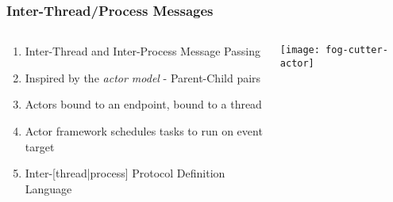 \documentclass[
	notes=none,
	aspectratio=169
]{beamer}
\begin{document}
\begin{frame}
\frametitle{Inter-Thread/Process Messages}

\begin{columns}[T]
\begin{column}[T]{0.7\textwidth}
\setlength{\parskip}{0.5em}

\vspace{1.0cm}
\begin{enumerate}
\setlength{\parskip}{0.5em}
\item Inter-Thread and Inter-Process Message Passing
\item Inspired by the {\it actor model\/} - Parent-Child pairs
\item Actors bound to an endpoint, bound to a thread
\item Actor framework schedules tasks to run on event target
\item Inter-[thread|process] Protocol Definition Language
\end{enumerate}

\end{column}
\begin{column}[T]{0.3\textwidth}
\setlength{\parskip}{0.5em}

\vspace{0.7cm}
\texttt{[image: fog-cutter-actor]}

\end{column}
\end{columns}

\end{frame}

\end{document}
